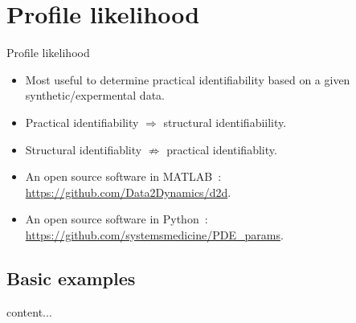 \documentclass[10pt]{beamer}
\begin{document}
\section{Profile likelihood}

\begin{frame}{Profile likelihood}
	\begin{itemize}
		\item Most useful to determine practical identifiability based on a given synthetic/expermental data.
		\item Practical identifiability $\Rightarrow$ structural identifiabiility.
		\item Structural identifiablity $\nRightarrow$ practical identifiablity.
		\vspace{10pt}
		\item An open source software in MATLAB~: 
		\url{https://github.com/Data2Dynamics/d2d}.
		\item An open source software in Python~: \url{https://github.com/systemsmedicine/PDE_params}.
	\end{itemize}
\end{frame}

\subsection{Basic examples}

\begin{frame}
	content...
\end{frame}
\end{document}
